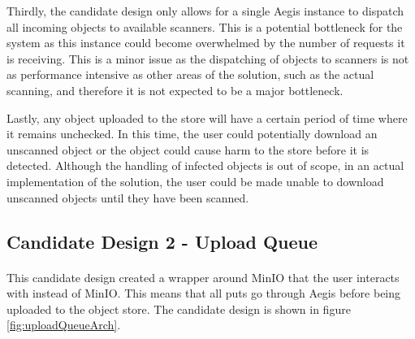 \documentclass[12pt, conference, final, a4paper, onecolumn, compsoc]{IEEEtran}
\begin{document}
Thirdly, the candidate design only allows for a single Aegis instance to
dispatch all incoming objects to available scanners. This is a potential
bottleneck for the system as this instance could become overwhelmed by the
number of requests it is receiving. This is a minor issue as the dispatching of
objects to scanners is not as performance intensive as other areas of the
solution, such as the actual scanning, and therefore it is not expected to be a
major bottleneck.

Lastly, any object uploaded to the store will have a certain period of time
where it remains unchecked. In this time, the user could potentially download an
unscanned object or the object could cause harm to the store before it is
detected. Although the handling of infected objects is out of scope, in an
actual implementation of the solution, the user could be made unable to download
unscanned objects until they have been scanned.


\subsection{Candidate Design 2 - Upload Queue}
\paragraph{}

This candidate design created a wrapper around MinIO that the user interacts
with instead of MinIO. This means that all puts go through Aegis before being
uploaded to the object store. The candidate design is shown in figure
\ref{fig:uploadQueueArch}.
\end{document}
